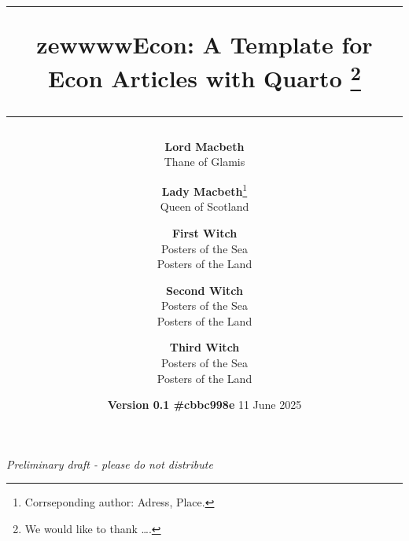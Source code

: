 \documentclass[12pt,a4paper,oneside]{article} %
\begin{document}

\setlength{\droptitle}{-8em}  %
	\title{	\rule{\linewidth}{0.5mm} \textbf{
		{\LARGE zewwwwEcon: A Template for Econ Articles with
Quarto \vspace{-15pt} }}\thanks{\noindent { }We would like to thank
\ldots.}  \rule{\linewidth}{0.5mm}  }
\date{\hspace{87pt}\scriptsize{\textbf{Version
0.1 \#cbbc998e}} \vspace{-5pt} \newline  \normalsize 11 June 2025} 

\author{
		\textbf{Lord Macbeth}\\
	\small{Thane of Glamis}\vspace{-1.5ex}\\
	\and	\textbf{Lady Macbeth}\thanks{ { }Corrseponding author: Adress,
Place.}\\
	\small{Queen of Scotland}\vspace{-1.5ex}\\
	\and	\textbf{First Witch}\\
	\small{Posters of the Sea}\vspace{-1.5ex}\\
	\small{Posters of the Land}\vspace{-1.5ex}\\
	\and	\textbf{Second Witch}\\
	\small{Posters of the Sea}\vspace{-1.5ex}\\
	\small{Posters of the Land}\vspace{-1.5ex}\\
	\and	\textbf{Third Witch}\\
	\small{Posters of the Sea}\vspace{-1.5ex}\\
	\small{Posters of the Land}\vspace{-1.5ex}\\
	\vspace{10pt}}

\maketitle
\thispagestyle{empty}

\begin{center}
\vspace{-25pt}	\noindent \textit{Preliminary draft - please do not
distribute}
\end{center}
\end{document}
